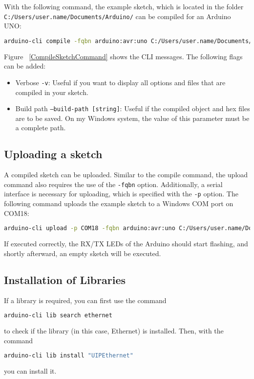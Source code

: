 With the following command, the example sketch, which is located in the folder \texttt{C:/Users/user.name/Documents/Arduino/} can be compiled for an Arduino UNO: 
\medskip
\begin{lstlisting}[language=bash]
    arduino-cli compile -fqbn arduino:avr:uno C:/Users/user.name/Documents/Arduino/cli_test
\end{lstlisting}
\medskip
Figure ~\ref{CompileSketchCommand} shows the CLI messages. The following flags can be added:
\begin{itemize}
    \item Verbose \texttt{-v}: Useful if you want to display all options and files that are compiled in your sketch.
    \item Build path \texttt{--build-path [string]}: Useful if the compiled object and hex files are to be saved. On my Windows system, the value of this parameter must be a complete path.
\end{itemize}

\subsection{Uploading a sketch}
A compiled sketch can be uploaded. Similar to the compile command, the upload command also requires the use of the \texttt{-fqbn} option. Additionally, a serial interface is necessary for uploading, which is specified with the \texttt{-p} option. The following command uploads the example sketch to a Windows COM port on COM18:
\begin{lstlisting}[language=bash]
    arduino-cli upload -p COM18 -fqbn arduino:avr:uno C:/Users/user.name/Documents/Arduino/cli_test
\end{lstlisting}

If executed correctly, the RX/TX LEDs of the Arduino should start flashing, and shortly afterward, an empty sketch will be executed.

\subsection{Installation of Libraries}

If a library is required, you can first use the command
\begin{lstlisting}[language=bash]
    arduino-cli lib search ethernet
\end{lstlisting}
to check if the library (in this case, Ethernet) is installed. Then, with the command
\begin{lstlisting}[language=bash]
    arduino-cli lib install "UIPEthernet"
\end{lstlisting}
you can install it.

